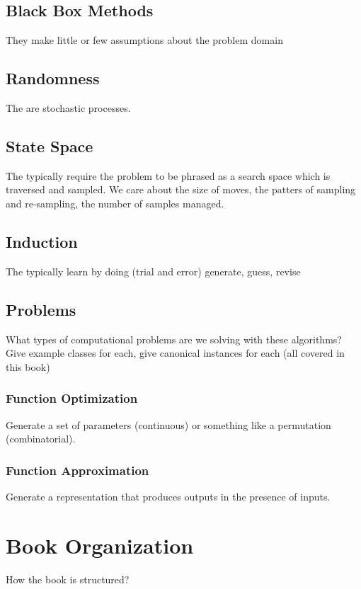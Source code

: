 \subsection{Black Box Methods}
They make little or few assumptions about the problem domain

\subsection{Randomness}
The are stochastic processes.

\subsection{State Space}
The typically require the problem to be phrased as a search space which is traversed and sampled.
We care about the size of moves, the patters of sampling and re-sampling, the number of samples managed.

\subsection{Induction}
The typically learn by doing (trial and error)
generate, guess, revise

\subsection{Problems}
What types of computational problems are we solving with these algorithms?
Give example classes for each, give canonical instances for each (all covered in this book)

\subsubsection{Function Optimization}
Generate a set of parameters (continuous) or something like a permutation (combinatorial).

\subsubsection{Function Approximation}
Generate a representation that produces outputs in the presence of inputs.


% 
% 
\section{Book Organization}
\label{intro:sec:organization}
How the book is structured?

